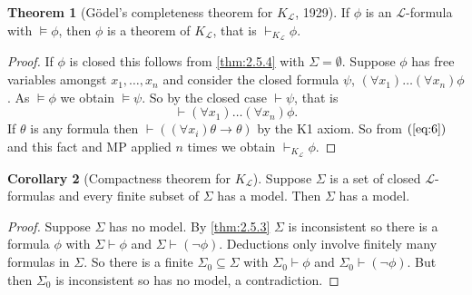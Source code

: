 \documentclass{article}
\newcommand{\rb}[1]{\left( #1 \right)}
\newcommand{\notb}[1]{\rb{\neg #1}}
\newcommand{\impb}[2]{\rb{#1 \rightarrow #2}}
\newcommand{\fab}[1]{\rb{\forall #1}}
\theoremstyle{definition}\newtheorem{definition}{Definition}[subsection]
\theoremstyle{definition}\newtheorem{remark}[definition]{Remark}
\theoremstyle{definition}\newtheorem*{example}{Example}
\theoremstyle{definition}\newtheorem*{note}{Note}
\newtheorem{theorem}[definition]{Theorem}
\newtheorem{corollary}[definition]{Corollary}
\begin{document}
\begin{theorem}[Gödel's completeness theorem for $ K_\mathcal{L} $, 1929]
If $ \phi $ is an $ \mathcal{L} $-formula with $ \vDash \phi $, then $ \phi $ is a theorem of $ K_\mathcal{L} $, that is $ \vdash_{K_\mathcal{L}} \phi $.
\end{theorem}

\begin{proof}
If $ \phi $ is closed this follows from \ref{thm:2.5.4} with $ \Sigma = \emptyset $. Suppose $ \phi $ has free variables amongst $ x_1, \dots, x_n $ and consider the closed formula $ \psi $, $ \fab{x_1} \dots \fab{x_n}\phi $. As $ \vDash \phi $ we obtain $ \vDash \psi $. So by the closed case $ \vdash \psi $, that is
\begin{equation}
\label{eq:6}
\vdash \fab{x_1} \dots \fab{x_n}\phi.
\end{equation}
If $ \theta $ is any formula then $ \vdash \impb{\fab{x_i}\theta}{\theta} $ by the K1 axiom. So from $ \rb{\ref{eq:6}} $ and this fact and MP applied $ n $ times we obtain $ \vdash_{K_\mathcal{L}} \phi $.
\end{proof}

\begin{corollary}[Compactness theorem for $ K_\mathcal{L} $]
\label{cor:2.5.6}
Suppose $ \Sigma $ is a set of closed $ \mathcal{L} $-formulas and every finite subset of $ \Sigma $ has a model. Then $ \Sigma $ has a model.
\end{corollary}

\begin{proof}
Suppose $ \Sigma $ has no model. By \ref{thm:2.5.3} $ \Sigma $ is inconsistent so there is a formula $ \phi $ with $ \Sigma \vdash \phi $ and $ \Sigma \vdash \notb{\phi} $. Deductions only involve finitely many formulas in $ \Sigma $. So there is a finite $ \Sigma_0 \subseteq \Sigma $ with $ \Sigma_0 \vdash \phi $ and $ \Sigma_0 \vdash \notb{\phi} $. But then $ \Sigma_0 $ is inconsistent so has no model, a contradiction.
\end{proof}

\end{document}
